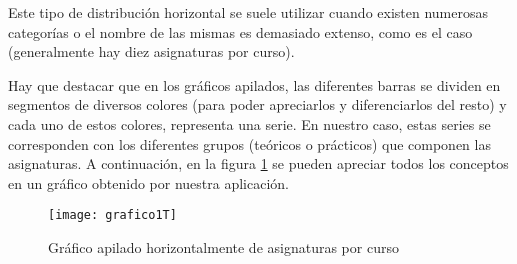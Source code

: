 Este tipo de distribución horizontal se suele utilizar cuando existen numerosas categorías o el nombre de las mismas es demasiado extenso, como es el caso (generalmente hay diez asignaturas por curso).

Hay que destacar que en los gráficos apilados, las diferentes barras se dividen en segmentos de diversos colores (para poder apreciarlos y diferenciarlos del resto) y cada uno de estos colores, representa una serie. En nuestro caso, estas series se corresponden con los diferentes grupos (teóricos o prácticos) que componen las asignaturas. A continuación, en la figura \ref{fig:grafico1T} se pueden apreciar todos los conceptos en un gráfico obtenido por nuestra aplicación. 

\begin{figure}%
		\centering
		\texttt{[image: grafico1T]}
		\caption{Gráfico apilado horizontalmente de asignaturas por curso}\label{fig:grafico1T}
	\end{figure}